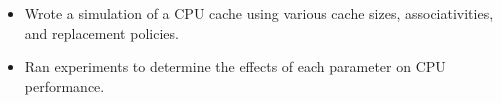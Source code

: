 
\begin{itemize}
    \item Wrote a simulation of a CPU cache using various cache sizes, associativities, and replacement policies.
    \item Ran experiments to determine the effects of each parameter on CPU performance.
\end{itemize}